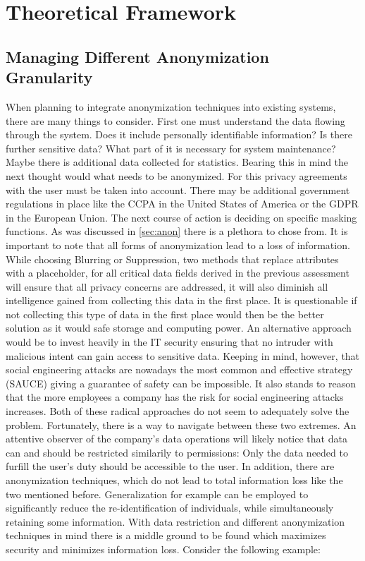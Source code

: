 \chapter{Theoretical Framework\label{cha:chapter3}}

\section{Managing Different Anonymization Granularity}
When planning to integrate anonymization techniques into existing systems, there are many things to consider. First one must understand the data flowing through the system.
Does it include personally identifiable information? Is there further sensitive data? What part of it is necessary for system maintenance? Maybe there is additional data collected for statistics.
Bearing this in mind the next thought would what needs to be anonymized. For this privacy agreements with the user must be taken into account. There may be additional government regulations in place like the \ac{CCPA} in the United States of America or the \ac{GDPR} in the European Union. 
The next course of action is deciding on specific masking functions. As was discussed in \ref{sec:anon} there is a plethora to chose from. It is important to note that all forms of anonymization lead to a loss of information. 
While choosing Blurring or Suppression, two methods that replace attributes with a placeholder, for all critical data fields derived in the previous assessment will ensure that all privacy concerns are addressed, it will also diminish all intelligence gained from collecting this data in the first place. It is questionable if not collecting this type of data in the first place would then be the better solution as it would safe storage and computing power. 
An alternative approach would be to invest heavily in the IT security ensuring that no intruder with malicious intent can gain access to sensitive data. Keeping in mind, however, that social engineering attacks are nowadays the most common and effective strategy (SAUCE) giving a guarantee of safety can be impossible. It also stands to reason that the more employees a company has the risk for social
engineering attacks increases. Both of these radical approaches do not seem to adequately solve the problem. Fortunately, there is a way to navigate between these two extremes. An attentive observer of the company's data operations will likely notice that data can and should be restricted similarily to permissions: Only the data needed to furfill the user's duty should be accessible to the user. 
In addition, there are anonymization techniques, which do not lead to total information loss like the two mentioned before. Generalization for example can be employed to significantly reduce the re-identification of individuals, while simultaneously retaining some information.
With data restriction and different anonymization techniques in mind there is a middle ground to be found which maximizes security and minimizes information loss. Consider the following example:

